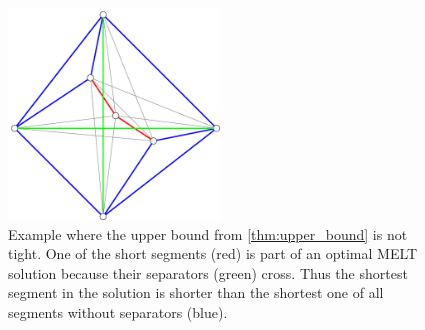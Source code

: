 \begin{figure}[ht]
  \centering
  \includegraphics[width=0.5\textwidth]{img/upper_bound_tightness.pdf}
  \caption{
    \label{fig:upper_bound_tightness}
    Example where the upper bound from \cref{thm:upper_bound} is not 
    tight. One of the short segments (red) is part of an optimal 
    \gls{MELT} solution because their separators (green) cross. Thus
    the shortest segment in the solution is shorter than the shortest
    one of all segments without separators (blue).
  }
\end{figure}  



